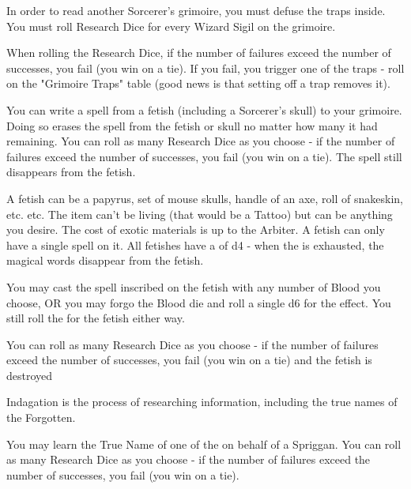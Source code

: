 {

In order to read another Sorcerer's grimoire, you must defuse the traps inside.  You must roll Research Dice for every Wizard Sigil on the grimoire.  

When rolling the Research Dice, if the number of failures exceed the number of successes, you fail (you win on a tie).  If you fail, you trigger one of the traps - roll on the "Grimoire Traps" table (good news is that setting off a trap removes it).


You can write a spell from a fetish (including a Sorcerer's skull) to your grimoire.  Doing so erases the spell from the fetish or skull no matter how many \UD it had remaining.  You can roll as many Research Dice as you choose - if the number of failures exceed the number of successes, you fail (you win on a tie).  The spell still disappears from the fetish.


A fetish can be a papyrus, set of mouse skulls, handle of an axe, roll of snakeskin, etc. etc.  The item can't be living (that would be a Tattoo) but can be anything you desire.  The cost of exotic materials is up to the Arbiter. A fetish can only have a single spell on it.  All fetishes have a \UD of d4 - when the \UD is exhausted, the magical words disappear from the fetish. 

You may cast the spell inscribed on the fetish with any number of Blood you choose, OR you may forgo the Blood die and roll a single d6 for the effect.  You still roll the \UD for the fetish either way.

You can roll as many Research Dice as you choose - if the number of failures exceed the number of successes, you fail (you win on a tie) and the fetish is destroyed 



Indagation is the process of researching information, including the true names of the Forgotten.



You may learn the True Name of one of the  on behalf of a Spriggan.  You can roll as many Research Dice as you choose - if the number of failures exceed the number of successes, you fail (you win on a tie).

}
